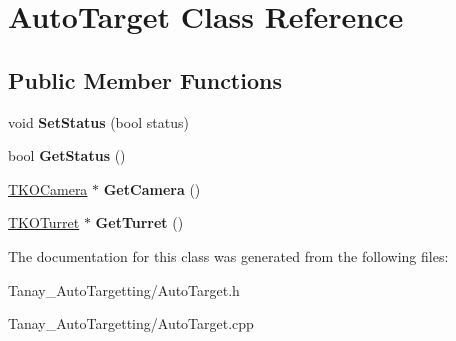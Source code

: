 \hypertarget{class_auto_target}{\section{Auto\-Target Class Reference}
\label{class_auto_target}
}
\subsection*{Public Member Functions}
\begin{DoxyCompactItemize}
\item 
\hypertarget{class_auto_target_a99d14582c957613ce4b007cab6cb4ede}{void {\bfseries Set\-Status} (bool status)}\label{class_auto_target_a99d14582c957613ce4b007cab6cb4ede}

\item 
\hypertarget{class_auto_target_a923ff75bce82fef677272478e969b753}{bool {\bfseries Get\-Status} ()}\label{class_auto_target_a923ff75bce82fef677272478e969b753}

\item 
\hypertarget{class_auto_target_a87bad0bcf59c89acf6874535a3d8f2f1}{\hyperlink{class_t_k_o_camera}{T\-K\-O\-Camera} $\ast$ {\bfseries Get\-Camera} ()}\label{class_auto_target_a87bad0bcf59c89acf6874535a3d8f2f1}

\item 
\hypertarget{class_auto_target_a4f3677b29010b28441f39e8891ff8e53}{\hyperlink{class_t_k_o_turret}{T\-K\-O\-Turret} $\ast$ {\bfseries Get\-Turret} ()}\label{class_auto_target_a4f3677b29010b28441f39e8891ff8e53}

\end{DoxyCompactItemize}


The documentation for this class was generated from the following files\-:\begin{DoxyCompactItemize}
\item 
Tanay\-\_\-\-Auto\-Targetting/Auto\-Target.\-h\item 
Tanay\-\_\-\-Auto\-Targetting/Auto\-Target.\-cpp\end{DoxyCompactItemize}
